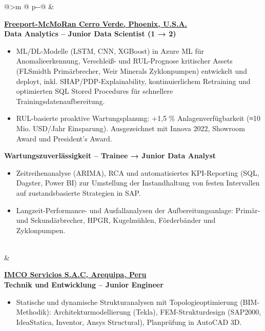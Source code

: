 \begin{tabular}{@{}>{\raggedleft\arraybackslash}m{\datecol} @{\hspace{\colgap}} p{\dimexpr\textwidth-\datecol-\colgap\relax}@{}}
 &
\begin{minipage}[t]{\linewidth}\vspace{0pt}
\begin{expblock}
  \footnotesize
  \setlength{\parindent}{0pt}\setlength{\parskip}{0pt}
  \textbf{\href{https://www.fcx.com}{Freeport-McMoRan Cerro Verde, Phoenix, U.S.A.}}\\[-0.1em]
  \textbf{Data Analytics – Junior Data Scientist (1 → 2)}\\[-1em]
\begin{itemize}[nosep,leftmargin=1em]
  \item ML/DL-Modelle (LSTM, CNN, XGBoost) in Azure ML für Anomalieerkennung, Verschleiß- und RUL-Prognose kritischer Assets (FLSmidth Primärbrecher, Weir Minerals Zyklonpumpen) entwickelt und deployt, inkl. SHAP/PDP-Explainability, kontinuierlichem Retraining und optimierten SQL Stored Procedures für schnellere Trainingsdatenaufbereitung.
  \item RUL-basierte proaktive Wartungsplanung: +1,5 \% Anlagenverfügbarkeit (≈10 Mio. USD/Jahr Einsparung). Ausgezeichnet mit Innova 2022, Showroom Award und President’s Award.
\end{itemize}

  \textbf{Wartungszuverlässigkeit – Trainee → Junior Data Analyst}\\[-1em]
  \begin{itemize}[nosep,leftmargin=1em]
\item Zeitreihenanalyse (ARIMA), RCA und automatisiertes KPI-Reporting (SQL, Dagster, Power BI) zur Umstellung der Instandhaltung von festen Intervallen auf zustandsbasierte Strategien in SAP.
\item Langzeit-Performance- und Ausfallanalysen der Aufbereitungsanlage: Primär- und Sekundärbrecher, HPGR, Kugelmühlen, Förderbänder und Zyklonpumpen.
  \end{itemize}
\end{expblock}
\end{minipage}
\\[-0.2em]

 &
\begin{minipage}[t]{\linewidth}\vspace{0pt}
\begin{expblock}
  \footnotesize
  \setlength{\parindent}{0pt}\setlength{\parskip}{0pt}
  \textbf{\href{https://www.linkedin.com/company/imco-servicios-s-a-c/posts/?feedView=all}{IMCO Servicios S.A.C, Arequipa, Peru}}\\[-0.1em]
  \textbf{Technik und Entwicklung – Junior Engineer}\\[-1em]
  \begin{itemize}[nosep,leftmargin=1em]
    \item Statische und dynamische Strukturanalysen mit Topologieoptimierung (BIM-Methodik): Architekturmodellierung (Tekla), FEM-Strukturdesign (SAP2000, IdeaStatica, Inventor, Ansys Structural), Planprüfung in AutoCAD 3D.


\end{itemize}
\end{expblock}
\end{minipage}
\end{tabular}
